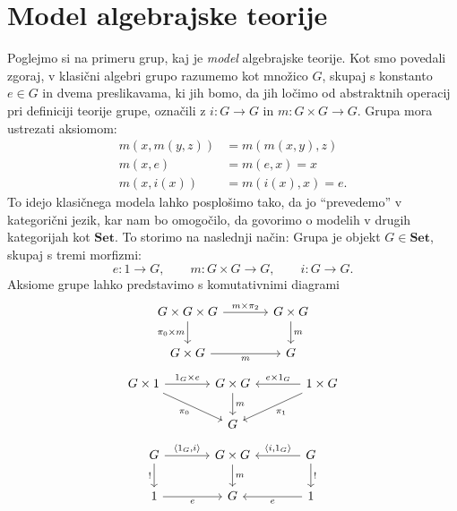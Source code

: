 \documentclass[../kategoricna_logika.tex]{subfiles}
\begin{document}
\section{Model algebrajske teorije}
Poglejmo si na primeru grup, kaj je \emph{model} algebrajske teorije.
Kot smo povedali zgoraj, v klasični algebri grupo razumemo kot množico $G$,
skupaj s konstanto $e \in G$ in dvema preslikavama,
ki jih bomo, da jih ločimo od abstraktnih operacij pri definiciji teorije
grupe, označili z $i : G \to G$ in $m : G \times G \to G$.
Grupa mora ustrezati aksiomom:
\begin{align*}
   m(x,m(y,z)) &= m(m(x,y),z) \\
   m(x,e) &= m(e,x) = x \\
   m(x,i(x)) &= m(i(x),x) = e.
\end{align*}
%
To idejo klasičnega modela lahko posplošimo tako, da jo "`prevedemo"' v
kategorični jezik, kar nam bo omogočilo, da govorimo o modelih v drugih
kategorijah kot $\mathbf{Set}$. To storimo na naslednji način:
Grupa je objekt $G \in \mathbf{Set}$, skupaj s tremi morfizmi:
\[ e : 1 \to G, \qquad m : G \times G \to G, \qquad i : G \to G. \]
Aksiome grupe lahko predstavimo s komutativnimi diagrami
\begin{equation}\label{diagram:asociativnost}
  \begin{tikzcd}[column sep = large]
    G \times G \times G \ar[d, "\pi_0 \times m"'] \ar[r, "m \times \pi_2"] & G \times G \ar[d, "m"] \\
    G \times G \ar[r, "m"'] & G
  \end{tikzcd}
\end{equation}
\begin{equation}\label{diagram:enota}
  \begin{tikzcd}[column sep = large]
    G \times 1 \ar[dr, "\pi_0"'] \ar[r, "1_G \times e"] & G \times G \ar[d, "m"] & 1 \times G \ar[l, "e \times 1_G"'] \ar[dl, "\pi_1"] \\
    & G
  \end{tikzcd}
\end{equation}
\begin{equation}\label{diagram:inverz}
  \begin{tikzcd}[column sep = large]
    G \ar[d, "!"'] \ar[r, "{\langle 1_G, i \rangle}"] & G \times G \ar[d, "m"] & G \ar[l, "{\langle i, 1_G \rangle}"'] \ar[d, "!"] \\
    1 \ar[r, "e"'] & G & 1 \ar[l, "e"]
  \end{tikzcd}
\end{equation}
\end{document}
